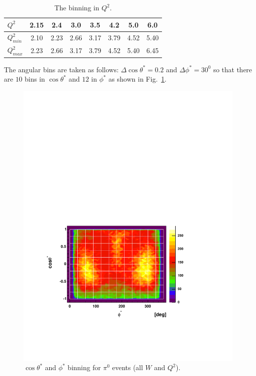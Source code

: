 \begin{table}[h]
 \begin{center}
  \begin{tabular}{|l|c|c|c|c|c|c|c|}
    \hline 
   $Q^2$        & 2.15  & 2.4  & 3.0  & 3.5  & 4.2  & 5.0  & 6.0 \\ 
    \hline  
   $Q^2_{min}$  & 2.10 & 2.23 & 2.66 & 3.17 & 3.79 & 4.52 & 5.40 \\
   \hline
   $Q^2_{max}$  & 2.23 & 2.66 & 3.17 & 3.79 & 4.52 & 5.40 & 6.45\\       
 \hline
  \end{tabular}
 \end{center} 
 \caption[The binning in $Q^2$]
         { The binning in $Q^2$.}
 \label{tab:binning}
\end{table}

The angular bins are taken as follows:
$\Delta \cos\theta^* = 0.2$ and $\Delta\phi^* = 30^0$ so that there are $10$ bins in  $\cos\theta^*$ and $12$ in $\phi^*$
as shown in  Fig.~\ref{fig:binning2}.
\begin{figure}[h]
 \begin{center}
  \includegraphics[width=12cm, bb=60 120 480 460]{analysis/img/binning2}
  \caption[$\cos\theta^*$ and $\phi^*$ binning for $\pi^0$ events]
          { $\cos\theta^*$ and $\phi^*$ binning for $\pi^0$ events (all $W$ and $Q^2$).}
 \label{fig:binning2}
\end{center} 
\end{figure}









